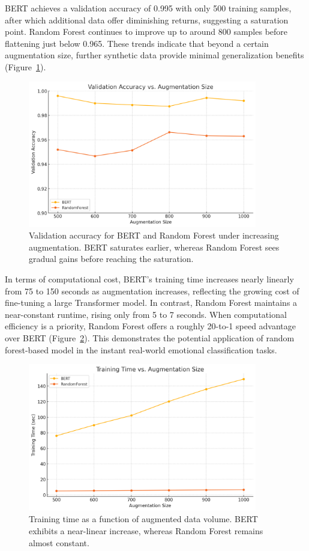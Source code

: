 \documentclass{article}
\begin{document}
BERT achieves a validation accuracy of 0.995 with only 500 training samples, after which additional data offer diminishing returns, suggesting a saturation point. Random Forest continues to improve up to around 800 samples before flattening just below 0.965. These trends indicate that beyond a certain augmentation size, further synthetic data provide minimal generalization benefits (Figure~\ref{fig:validation_accuracy}).


\begin{figure}[H]
    \centering
    \includegraphics[width=10cm]{output (2).png}
    \caption{Validation accuracy for BERT and Random Forest under increasing augmentation. BERT saturates earlier, whereas Random Forest sees gradual gains before reaching the saturation.}
    \label{fig:validation_accuracy}
\end{figure}

In terms of computational cost, BERT’s training time increases nearly linearly from 75 to 150 seconds as augmentation increases, reflecting the growing cost of fine-tuning a large Transformer model. In contrast, Random Forest maintains a near-constant runtime, rising only from 5 to 7 seconds. When computational efficiency is a priority, Random Forest offers a roughly 20-to-1 speed advantage over BERT (Figure~\ref{fig:training_time}). This demonstrates the potential application of random forest-based model in the instant real-world emotional classification tasks. 


\begin{figure}[H]
    \centering
    \includegraphics[width=10cm]{output (3).png}
    \caption{Training time as a function of augmented data volume. BERT exhibits a near-linear increase, whereas Random Forest remains almost constant.}
    \label{fig:training_time}
\end{figure}
\end{document}
